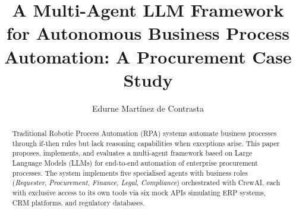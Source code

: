 \documentclass[preprint,12pt,authoryear]{elsarticle}
\begin{document}
\begin{frontmatter}

\title{A Multi-Agent LLM Framework for Autonomous Business Process Automation:
       A Procurement Case Study}

\author[uax,proj]{Edurne Martínez de Contrasta}

\address[uax]{Máster en Big Data y Business Analytics,
              Universidad Alfonso X el Sabio, Madrid, Spain}

\address[proj]{PROJENER.AI SL, Madrid, Spain}

\begin{abstract}
Traditional Robotic Process Automation (RPA) systems automate business processes
through if-then rules but lack reasoning capabilities when exceptions arise.
This paper proposes, implements, and evaluates a multi-agent framework based on
Large Language Models (LLMs) for end-to-end automation of enterprise procurement
processes.
The system implements five specialised agents with business roles
(\emph{Requester}, \emph{Procurement}, \emph{Finance}, \emph{Legal},
\emph{Compliance}) orchestrated with CrewAI, each with exclusive access to its
own tools via six mock APIs simulating ERP systems, CRM platforms, and
regulatory databases.


\end{abstract}
\end{frontmatter}
\end{document}
